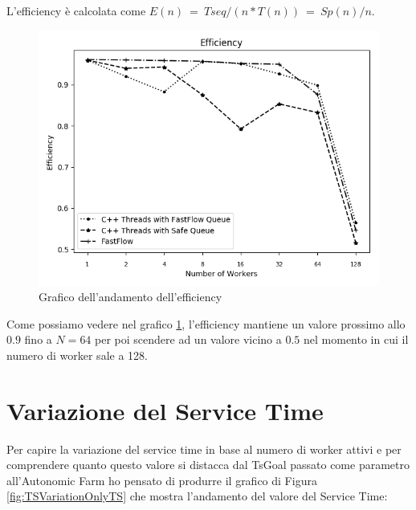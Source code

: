 \documentclass[12pt]{report}
\begin{document}
L'efficiency è calcolata come $E(n)\ =\ Tseq/(n*T(n))\ =\ Sp(n)/n$.

\begin{figure}[H]
    \centering
    \includegraphics[width=0.65\linewidth]{Efficiency.png}
    \caption{Grafico dell'andamento dell'efficiency}
    \label{Efficiency}
  \end{figure}
  
Come possiamo vedere nel grafico \ref{Efficiency}, l'efficiency mantiene un valore prossimo allo $0.9$ fino a $N=64$ per poi scendere ad un valore vicino a $0.5$ nel momento in cui il numero di worker sale a 128.


\section{Variazione del Service Time}

Per capire la variazione del service time in base al numero di worker attivi e per comprendere quanto questo valore si distacca dal TsGoal passato come parametro all'Autonomic Farm ho pensato di produrre il grafico di Figura \ref{fig:TSVariationOnlyTS} che mostra l'andamento del valore del Service Time:
\end{document}
